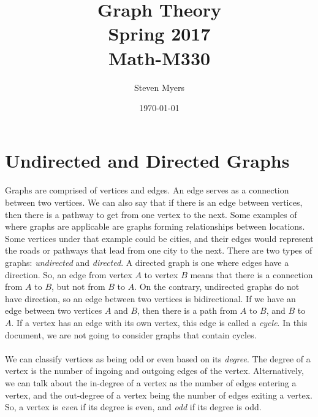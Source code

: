 \documentclass{article}
\begin{document}
\title{Graph Theory\\ Spring 2017\\ Math-M330}         %
\author{Steven Myers}        %
\date{\today}          %
\maketitle


\makeatother     %

\pagestyle{plain}

\section*{Undirected and Directed Graphs}

\paragraph{}
Graphs are comprised of vertices and edges. An edge serves as a connection between two vertices. We can also say that if there is an edge between vertices, then there is a pathway to get from one vertex to the next. Some examples of where graphs are applicable are graphs forming relationships between locations. Some vertices under that example could be cities, and their edges would represent the roads or pathways that lead from one city to the next. There are two types of graphs: \textit{undirected} and \textit{directed}. A directed graph is one where edges have a direction. So, an edge from vertex $A$ to vertex $B$ means that there is a connection from $A$ to $B$, but not from $B$ to $A$. On the contrary, undirected graphs do not have direction, so an edge between two vertices is bidirectional. If we have an edge between two vertices $A$ and $B$, then there is a path from $A$ to $B$, and $B$ to $A$. If a vertex has an edge with its own vertex, this edge is called a \textit{cycle}. In this document, we are not going to consider graphs that contain cycles.

\paragraph{}
We can classify vertices as being odd or even based on its \textit{degree}. The degree of a vertex is the number of ingoing and outgoing edges of the vertex. Alternatively, we can talk about the in-degree of a vertex as the number of edges entering a vertex, and the out-degree of a vertex being the number of edges exiting a vertex. So, a vertex is \textit{even} if its degree is even, and \textit{odd} if its degree is odd.
\end{document}
